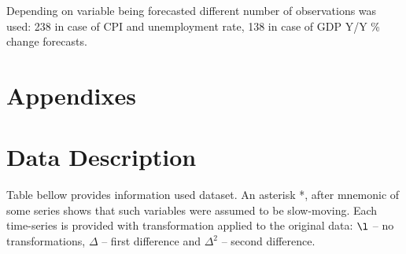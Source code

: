\documentclass[a4paper, 14pt]{article}
\begin{document}
Depending on variable being forecasted different number of observations was used: 238 in case of CPI and unemployment rate, 138 in case of GDP Y/Y \% change forecasts. 




\newpage
\section*{Appendixes}
\appendix
\section{Data Description}
Table bellow provides information used dataset. An asterisk *, after mnemonic of some series shows that such variables were assumed to be slow-moving. Each time-series is provided with transformation applied to the original data: $\l$ -- no transformations, $\Delta$ -- first difference and $\Delta^2$ -- second difference. 
\end{document}
